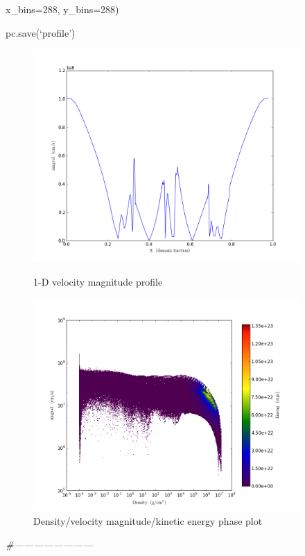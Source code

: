 {\setlength{\parindent}{143pt}x\_bins=288, y\_bins=288)}

pc.save(`profile')
\begin{figure}[h]
  \centering
  \includegraphics[width=4.0in]{LineQueryPlot_0_t_magvel}
  \caption{1-D velocity magnitude profile}
  \includegraphics[width=4.0in]{Profile2D_1_Density_magvel_kineng}
  \caption{Density/velocity magnitude/kinetic energy phase plot}
\end{figure}
\quad

{\it\#------------------------}

